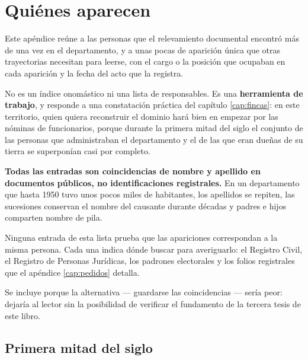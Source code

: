 \chapter{Quiénes aparecen}
\label{cap:personas}

Este apéndice reúne a las personas que el relevamiento documental encontró más de una vez en el departamento, y a unas pocas de aparición única que otras trayectorias necesitan para leerse, con el cargo o la posición que ocupaban en cada aparición y la fecha del
acto que la registra.

No es un índice onomástico ni una lista de responsables. Es una \textbf{herramienta de
trabajo}, y responde a una constatación práctica del capítulo \ref{cap:fincas}: en este territorio, quien
quiera reconstruir el dominio hará bien en empezar por las nóminas de funcionarios, porque
durante la primera mitad del siglo el conjunto de las personas que administraban el
departamento y el de las que eran dueñas de su tierra se superponían casi por completo.

\begin{cautela}
\textbf{Todas las entradas son coincidencias de nombre y apellido en documentos públicos, no
identificaciones registrales.} En un departamento que hasta 1950 tuvo unos pocos miles de
habitantes, los apellidos se repiten, las sucesiones conservan el nombre del causante durante
décadas y padres e hijos comparten nombre de pila.

Ninguna entrada de esta lista prueba que las apariciones correspondan a la misma persona.
Cada una indica dónde buscar para averiguarlo: el Registro Civil, el Registro de Personas
Jurídicas, los padrones electorales y los folios registrales que el apéndice \ref{cap:pedidos} detalla.

Se incluye porque la alternativa --- guardarse las coincidencias --- sería peor: dejaría al
lector sin la posibilidad de verificar el fundamento de la tercera tesis de este libro.
\end{cautela}

\section*{Primera mitad del siglo}

